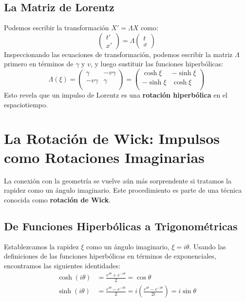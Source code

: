 \documentclass[11pt,a4paper]{article}
\begin{document}
\subsection{La Matriz de Lorentz}
Podemos escribir la transformación $X' = \Lambda X$ como:
\[ \begin{pmatrix} t' \\ x'  \end{pmatrix} = \Lambda \begin{pmatrix} t \\ x  \end{pmatrix} \]
Inspeccionando las ecuaciones de transformación, podemos escribir la matriz $\Lambda$ primero en términos de $\gamma$ y $v$, y luego sustituir las funciones hiperbólicas:
\[
\Lambda(\xi) = \begin{pmatrix} \gamma & -v\gamma  \\ -v\gamma & \gamma  \\  \end{pmatrix}
=
\boxed{
\begin{pmatrix} \cosh\xi & -\sinh\xi  \\ -\sinh\xi & \cosh\xi  \\  \end{pmatrix}
}
\]
Esto revela que un impulso de Lorentz es una \textbf{rotación hiperbólica} en el espaciotiempo.

\section{La Rotación de Wick: Impulsos como Rotaciones Imaginarias}

La conexión con la geometría se vuelve aún más sorprendente si tratamos la rapidez como un ángulo imaginario. Este procedimiento es parte de una técnica conocida como \textbf{rotación de Wick}.

\subsection{De Funciones Hiperbólicas a Trigonométricas}
Establezcamos la rapidez $\xi$ como un ángulo imaginario, $\xi = i\theta$. Usando las definiciones de las funciones hiperbólicas en términos de exponenciales, encontramos las siguientes identidades:
\begin{align*}
    \cosh(i\theta) &= \frac{e^{i\theta} + e^{-i\theta}}{2} = \cos\theta \\
    \sinh(i\theta) &= \frac{e^{i\theta} - e^{-i\theta}}{2} = i \left( \frac{e^{i\theta} - e^{-i\theta}}{2i} \right) = i\sin\theta
\end{align*}
\end{document}
